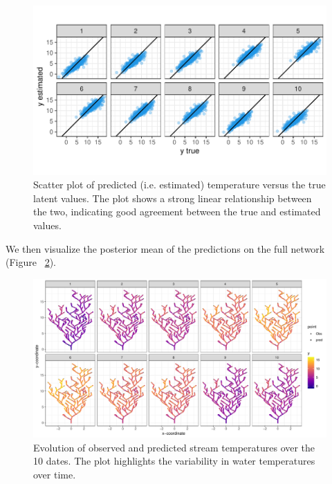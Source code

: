 \begin{figure}[htbp]
  \centering
   \includegraphics[width=5.0in]{./Figs/5y_predtrue_vs_predpred.pdf}
  \caption{
  Scatter plot of predicted (i.e. estimated) temperature versus the true latent values. The plot shows a strong linear relationship between the two, indicating good agreement between the true and estimated values. 
  }
  \label{figure:5y_predtrue_vs_predpred}
\end{figure}


We then visualize the posterior mean of the predictions on the full network (Figure ~\ref{figure:6network_preds}).

\begin{figure}[htbp]
  \centering
   \includegraphics[width=6.0in]{./Figs/6network_preds.pdf}
  \caption{
  Evolution of observed and predicted stream temperatures over the 10 dates. The plot highlights the variability in water temperatures over time.
  }
  \label{figure:6network_preds}
\end{figure}



